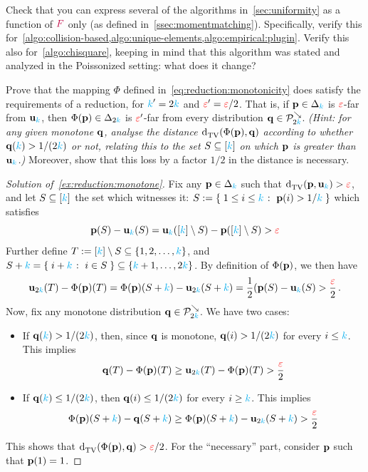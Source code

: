 \begin{question}\label{exo:reexpress:algos:frequency:only}
Check that you can express several of the algorithms in~\cref{sec:uniformity} as a function of $\textcolor{purple}{F}$ only (as defined in~\cref{ssec:momentmatching}). Specifically, verify this for~\cref{algo:collision-based,algo:unique-elements,algo:empirical:plugin}. Verify this also for~\cref{algo:chisquare}, keeping in mind that this algorithm was stated and analyzed in the Poissonized setting: what does it change?
\end{question}
\begin{question}[$\star$]\label{ex:reduction:monotone}
  Prove that the mapping $\Phi$ defined in~\cref{eq:reduction:monotonicity} does satisfy the requirements of a reduction, for ${\textcolor{cyan}{k}}'=2{\textcolor{cyan}{k}}$ and $\textcolor{red}{\varepsilon}'=\textcolor{red}{\varepsilon}/2$. That is, if $\mathbf{p}\in\Delta_{{\textcolor{cyan}{k}}}$ is $\textcolor{red}{\varepsilon}$-far from $\mathbf{u}_{\textcolor{cyan}{k}}$, then $\Phi(\mathbf{p})\in\Delta_{2{\textcolor{cyan}{k}}}$ is $\textcolor{red}{\varepsilon}'$-far from every distribution $\mathbf{q}\in\mathcal{P}^{\searrow}_{2{\textcolor{cyan}{k}}}$. \textit{(Hint: for any given monotone $\mathbf{q}$, analyse the distance $\totalvardist{\Phi(\p)}{\q}$ according to whether $\mathbf{q}({\textcolor{cyan}{k}}) > 1/(2{\textcolor{cyan}{k}})$ or not, relating this to the set $S\subseteq[{\textcolor{cyan}{k}}]$ on which $\mathbf{p}$ is greater than $\mathbf{u}_{\textcolor{cyan}{k}}$.)} Moreover, show that this loss by a factor $1/2$ in the distance is necessary.
\end{question}
\iffalse %
\begin{proof}[Solution of~\cref{ex:reduction:monotone}]
Fix any $\mathbf{p}\in\Delta_{{\textcolor{cyan}{k}}}$ such that $\totalvardist{\p}{\uniform_\ab}>\dst$, and let $S\subseteq [{\textcolor{cyan}{k}}]$ the set which witnesses it:
$S\eqdef \setOfSuchThat{ 1\leq i\leq \ab }{\p(i)> 1/\ab }$ 
which satisfies 
\[
	\mathbf{p}(S)-\mathbf{u}_{\textcolor{cyan}{k}}(S) = \mathbf{u}_{\textcolor{cyan}{k}}([{\textcolor{cyan}{k}}]\setminus S)- \mathbf{p}([{\textcolor{cyan}{k}}]\setminus S) >\textcolor{red}{\varepsilon}
\]
Further define $T := [{\textcolor{cyan}{k}}]\setminus S \subseteq \{1,2,\dots,{\textcolor{cyan}{k}}\}$, and $S+\ab = \setOfSuchThat{i+\ab}{i\in S} \subseteq \{\ab+1,\dots,2\ab\}$. 
By definition of $\Phi(\mathbf{p})$, we then have
\[
	\mathbf{u}_{2{\textcolor{cyan}{k}}}(T)-\Phi(\mathbf{p})(T)=\Phi(\mathbf{p})(S+{\textcolor{cyan}{k}})-\mathbf{u}_{2{\textcolor{cyan}{k}}}(S+{\textcolor{cyan}{k}})= \frac{1}{2}(\mathbf{p}(S)-\mathbf{u}_{\textcolor{cyan}{k}}(S)>\frac{\textcolor{red}{\varepsilon}}{2}\,.
\]
Now, fix any monotone distribution $\mathbf{q}\in\mathcal{P}^{\searrow}_{2{\textcolor{cyan}{k}}}$. We have two cases:
\begin{itemize}
\item If $\mathbf{q}({\textcolor{cyan}{k}}) > 1/(2{\textcolor{cyan}{k}})$, then, since $\mathbf{q}$ is monotone, $\mathbf{q}(i) > 1/(2{\textcolor{cyan}{k}})$ for every $i \leq {\textcolor{cyan}{k}}$. This implies
\[
	\mathbf{q}(T)-\Phi(\mathbf{p})(T) \geq \mathbf{u}_{2{\textcolor{cyan}{k}}}(T)-\Phi(\mathbf{p})(T) > \frac{\textcolor{red}{\varepsilon}}{2}
\]
\item If $\mathbf{q}({\textcolor{cyan}{k}}) \leq 1/(2{\textcolor{cyan}{k}})$, then $\mathbf{q}(i) \leq 1/(2{\textcolor{cyan}{k}})$ for every $i \geq {\textcolor{cyan}{k}}$. This implies
\[
	\Phi(\mathbf{p})(S+{\textcolor{cyan}{k}})-\mathbf{q}(S+{\textcolor{cyan}{k}}) \geq \Phi(\mathbf{p})(S+{\textcolor{cyan}{k}})-\mathbf{u}_{2{\textcolor{cyan}{k}}}(S+{\textcolor{cyan}{k}}) > \frac{\textcolor{red}{\varepsilon}}{2}
\]
\end{itemize}
This shows that $\totalvardist{\Phi(\p)}{\q} > \dst/2$. For the ``necessary'' part, consider $\mathbf{p}$ such that $\mathbf{p}(1)=1$.
\end{proof}
